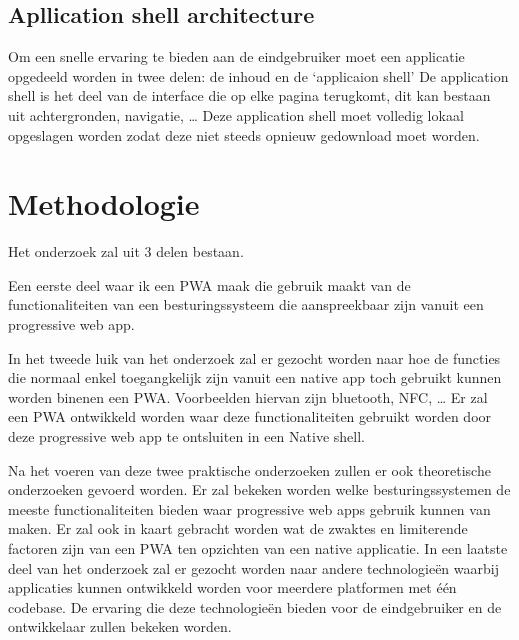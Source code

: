 \subsection{Apllication shell architecture}
Om een snelle ervaring te bieden aan de eindgebruiker moet een applicatie opgedeeld worden in twee delen: de inhoud en de ‘applicaion shell’
De application shell is het deel van de interface die op elke pagina terugkomt, dit kan bestaan uit achtergronden, navigatie, …
Deze application shell moet volledig lokaal opgeslagen worden zodat deze niet steeds opnieuw gedownload moet worden.
\autocite{Hiltunen2018}




\section{Methodologie}
\label{sec:methodologie}
Het onderzoek zal uit 3 delen bestaan. 

Een eerste deel waar ik een PWA maak die gebruik maakt van de functionaliteiten van een besturingssysteem die aanspreekbaar zijn vanuit een progressive web app. 

In het tweede luik van het onderzoek zal er gezocht worden naar hoe de functies die normaal enkel toegangkelijk zijn vanuit een native app toch gebruikt kunnen worden binenen een PWA. Voorbeelden hiervan zijn bluetooth, NFC, … 
Er zal een PWA ontwikkeld worden waar deze functionaliteiten gebruikt worden door deze progressive web app te ontsluiten in een Native shell.

Na het voeren van deze twee praktische onderzoeken zullen er ook theoretische onderzoeken gevoerd worden. 
Er zal bekeken worden welke besturingssystemen de meeste functionaliteiten bieden waar progressive web apps gebruik kunnen van maken. 
Er zal ook in kaart gebracht worden wat de zwaktes en limiterende factoren zijn van een PWA ten opzichten van een native applicatie.
In een laatste deel van het onderzoek zal er gezocht worden naar andere technologieën waarbij applicaties kunnen ontwikkeld worden voor meerdere platformen met één codebase. De ervaring die deze technologieën bieden voor de eindgebruiker en de ontwikkelaar zullen bekeken worden.




